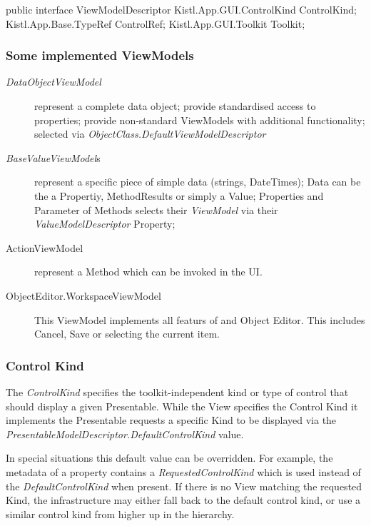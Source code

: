 \begin{CS}
public interface ViewModelDescriptor
{
	Kistl.App.GUI.ControlKind ControlKind;
	Kistl.App.Base.TypeRef ControlRef;
	Kistl.App.GUI.Toolkit Toolkit;
}
\end{CS}

\subsubsection{Some implemented ViewModels}

\begin{description}

\item[\emph{DataObjectViewModel}]{represent a complete data object;
provide standardised access to properties; provide non-standard ViewModels
with additional functionality; selected via
\emph{ObjectClass.DefaultViewModelDescriptor}}

\item[\emph{BaseValueViewModel}s]{represent a specific piece of simple data (strings, DateTimes);
Data can be the a Propertiy, MethodResults or simply a Value; Properties and Parameter of Methods selects their \emph{ViewModel} via their
\emph{ValueModelDescriptor} Property; }

\item[ActionViewModel]{represent a Method which can be invoked in the UI.}

\item[ObjectEditor.WorkspaceViewModel] { This ViewModel implements all featurs of and Object Editor. This includes Cancel, Save or selecting the current item.}

\end{description} 

\subsubsection{Control Kind}

The \emph{ControlKind} specifies the toolkit-independent kind or type of
control that should display a given Presentable. While the View
specifies the Control Kind it implements the Presentable requests a
specific Kind to be displayed via the
\emph{PresentableModelDescriptor.DefaultControlKind} value.

In special situations this default value can be overridden. For example,
the metadata of a property contains a \emph{RequestedControlKind} which
is used instead of the \emph{DefaultControlKind} when present. If there
is no View matching the requested Kind, the infrastructure may either
fall back to the default control kind, or use a similar control kind
from higher up in the hierarchy.

